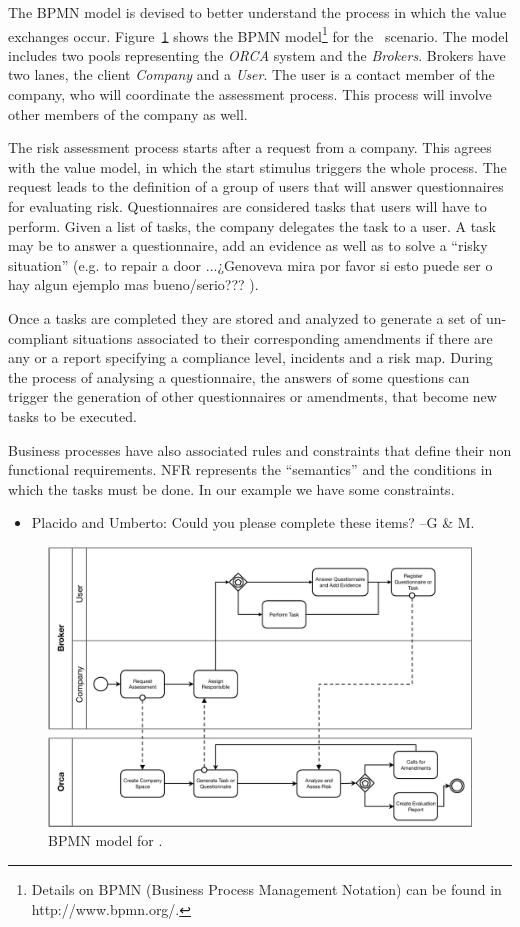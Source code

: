 The BPMN model is devised to better understand the process in which the value exchanges occur.
Figure~\ref{fig:BPMNmodel} shows the BPMN model\footnote{Details on BPMN (Business Process Management Notation) can be found in http://www.bpmn.org/.} for the \FlyingPig\ scenario. 
The model includes two pools representing the \textsl{ORCA} system and the \textsl{Brokers}. 
Brokers have two lanes, the client \textsl{Company} and a \textsl{User}. 
The user is a contact member of the company, who will coordinate the assessment process. 
This process will involve other members of the company as well.

The risk assessment process starts after a request from a company.
This agrees with the value model, in which the start stimulus triggers the whole process. 
The request leads to the definition of a group of users that will answer questionnaires for evaluating risk.
Questionnaires are considered tasks that users will have to perform. 
Given a list of tasks, the company delegates the task to a user.
A task may be to answer a questionnaire, add an evidence as well as to solve a ``risky situation'' (e.g. to repair a door {\color{blue} ...¿Genoveva mira por favor si esto puede ser o hay algun ejemplo mas bueno/serio???} ).

Once a tasks are completed they are stored and analyzed to generate a set of un-compliant situations associated to their corresponding amendments if there are any or a report specifying a compliance level, incidents and a risk map.
During the process of analysing a questionnaire, the answers of some questions can trigger the generation of other questionnaires or amendments, that become new tasks to be executed.  

Business processes have also associated rules and constraints that define their non functional requirements.
NFR represents the ``semantics'' and the conditions in which the tasks must be done.
In our example we have some constraints.
\begin{itemize}
\item {\color{magenta} Placido and Umberto: Could you please complete these items? --G \& M.}
\end{itemize}

\begin{figure}[t]
\centering
\includegraphics[width=1.0\textwidth]{figs/BPMN_GCP.pdf}
\caption{BPMN model for \FlyingPig.\label{fig:BPMNmodel}}
\end{figure}


